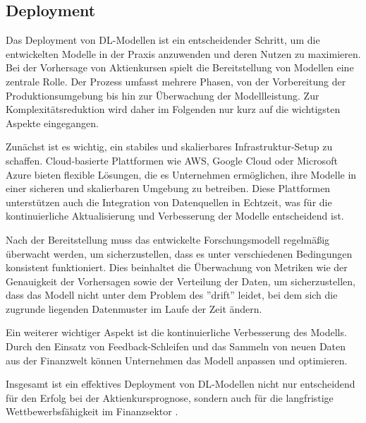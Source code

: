 \newpage
\subsection{Deployment}\label{sec:modellierung}

Das Deployment von \ac{DL}-Modellen ist ein entscheidender Schritt, um die entwickelten Modelle in der Praxis anzuwenden und deren Nutzen zu maximieren. Bei der Vorhersage von Aktienkursen spielt die Bereitstellung von Modellen eine zentrale Rolle. Der Prozess umfasst mehrere Phasen, von der Vorbereitung der Produktionsumgebung bis hin zur Überwachung der Modellleistung. Zur Komplexitätsreduktion wird daher im Folgenden nur kurz auf die wichtigsten Aspekte eingegangen.

Zunächst ist es wichtig, ein stabiles und skalierbares Infrastruktur-Setup zu schaffen. Cloud-basierte Plattformen wie AWS, Google Cloud oder Microsoft Azure bieten flexible Lösungen, die es Unternehmen ermöglichen, ihre Modelle in einer sicheren und skalierbaren Umgebung zu betreiben. Diese Plattformen unterstützen auch die Integration von Datenquellen in Echtzeit, was für die kontinuierliche Aktualisierung und Verbesserung der Modelle entscheidend ist.

Nach der Bereitstellung muss das entwickelte Forschungsmodell regelmäßig überwacht werden, um sicherzustellen, dass es unter verschiedenen Bedingungen konsistent funktioniert. Dies beinhaltet die Überwachung von Metriken wie der Genauigkeit der Vorhersagen sowie der Verteilung der Daten, um sicherzustellen, dass das Modell nicht unter dem Problem des ''drift'' leidet, bei dem sich die zugrunde liegenden Datenmuster im Laufe der Zeit ändern.

Ein weiterer wichtiger Aspekt ist die kontinuierliche Verbesserung des Modells. Durch den Einsatz von Feedback-Schleifen und das Sammeln von neuen Daten aus der Finanzwelt können Unternehmen das Modell anpassen und optimieren.

Insgesamt ist ein effektives Deployment von \ac{DL}-Modellen nicht nur entscheidend für den Erfolg bei der Aktienkursprognose, sondern auch für die langfristige Wettbewerbsfähigkeit im Finanzsektor \autocite{mason2018machine}\autocite{chen2019model}\cite{microsoft2020}.








